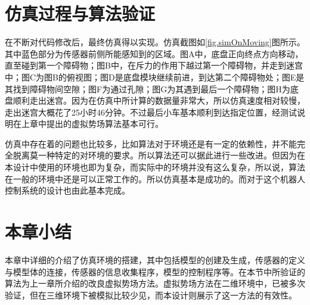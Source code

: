 \section{仿真过程与算法验证}
在不断对代码修改后，最终仿真得以实现。仿真截图如\ref{fig.simOnMoving}图所示。其中蓝色部分为传感器前侧所能感知到的区域。图A中，底盘正向终点方向移动，直至碰到第一个障碍物；图B中，在斥力的作用下越过第一个障碍物，并走到迷宫中；图C为图B的俯视图；图D是底盘模块继续前进，到达第二个障碍物处；图E是其找到障碍物间空隙；图F为通过孔隙；图G为其遇到最后一个障碍物；图H为底盘顺利走出迷宫。因为在仿真中所计算的数据量非常大，所以仿真速度相对较慢，走出迷宫大概花了25小时46分钟。不过最后小车基本顺利到达指定位置，经测试说明在上章中提出的虚拟势场算法基本可行。
\begin{figure}[!htp]
  \centering
  	\hspace{0.2cm}
	\hspace{0.2cm}
	\hspace{0.2cm}
	\hspace{0.2cm}
	\hspace{0.2cm}
    \hspace{0.2cm}
	\hspace{0.2cm}
\end{figure}

仿真中存在着的问题也比较多，比如算法对于环境还是有一定的依赖性，并不能完全脱离莫一种特定的对环境的要求。所以算法还可以据此进行一些改进。但因为在本设计中使用的环境也即为复杂，而实际中的环境并没有这么复杂，所以说，算法在一般的环境中还是可以正常工作的。所以仿真基本是成功的。而对于这个机器人控制系统的设计也由此基本完成。
\section{本章小结}
本章中详细的介绍了仿真环境的搭建，其中包括模型的创建及生成，传感器的定义与模型体的连接，传感器的信息收集程序，模型的控制程序等。在本节中所验证的算法为上一章所介绍的改良虚拟势场方法。虚拟势场方法在二维环境中，已被多次验证，但在三维环境下被模拟比较少见，而本设计则展示了这一方法的有效性。
